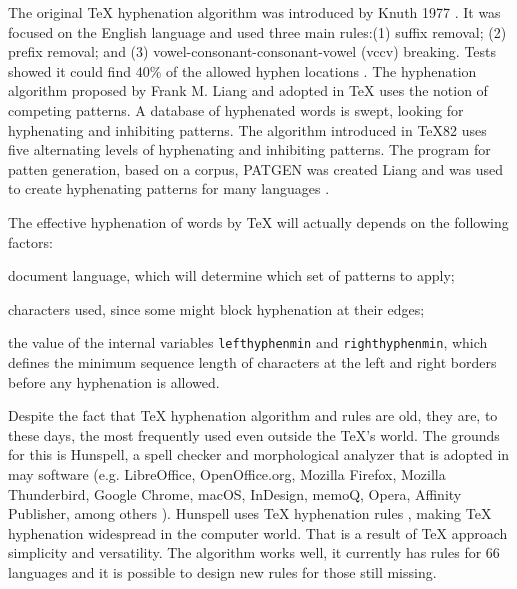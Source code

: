 \documentclass{article}
\begin{document}
The original \TeX{} hyphenation algorithm was introduced by Knuth 1977
\cite{knuth1977}. It was focused on the English language and used three main
rules:(1) suffix removal; (2) prefix removal; and (3)
vowel-consonant-consonant-vowel (vccv) breaking. Tests showed it could find
40\% of the allowed hyphen locations \cite{liang1983}. The hyphenation
algorithm proposed by Frank M. Liang and adopted in \TeX{} uses the notion of
competing patterns. A database of hyphenated words is swept, looking for
hyphenating and inhibiting patterns. The algorithm introduced in \TeX{}82 uses
five alternating levels of hyphenating and inhibiting patterns. The program
for patten generation, based on a corpus, PATGEN was created Liang
\cite{liangbreitenlohner1999} and was used to create hyphenating patterns for
many languages
\cite{sojka1995,sojka1995a,sojka2005thesis,sojka2003,scannell2003}.

The effective hyphenation of words by \TeX{} will actually depends on the following factors:
\begin{enumerate*}[label=\arabic*)]
    \item document language, which will determine which set of patterns to apply;
    \item characters used, since some might block hyphenation at their edges;
    \item the value of the internal variables \verb|lefthyphenmin| and \verb|righthyphenmin|,
        which defines the minimum sequence length of characters at the left and right borders
        before any hyphenation is allowed.
\end{enumerate*}

Despite the fact that \TeX{} hyphenation algorithm and rules are old, they are,
to these days, the most frequently used even outside the \TeX{}'s world. The
grounds for this is Hunspell, a spell checker and morphological analyzer that
is adopted in may software (e.g. LibreOffice, OpenOffice.org, Mozilla Firefox,
Mozilla Thunderbird, Google Chrome, macOS, InDesign, memoQ, Opera, Affinity
Publisher, among others \cite{hunspell}). Hunspell uses \TeX{} hyphenation
rules \cite{hunspellhyphen,levien1998}, making \TeX{} hyphenation widespread in
the computer world. That is a result of \TeX{} approach simplicity and
versatility.  The algorithm works well, it currently has rules for 66 languages
\cite{texhyphenrules} and it is possible to design new rules for those still
missing.
\end{document}
